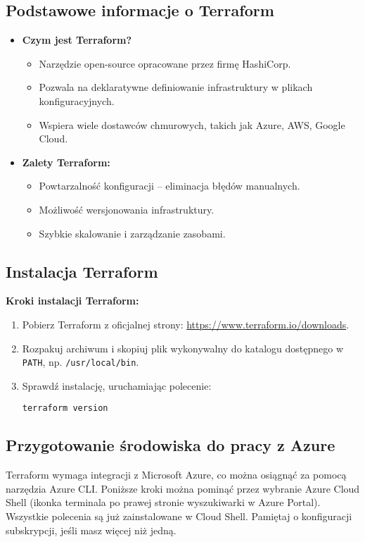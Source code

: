 \documentclass{article}
\begin{document}
\subsection{Podstawowe informacje o Terraform}
\begin{itemize}
    \item \textbf{Czym jest Terraform?}
    \begin{itemize}
        \item Narzędzie open-source opracowane przez firmę HashiCorp.
        \item Pozwala na deklaratywne definiowanie infrastruktury w plikach konfiguracyjnych.
        \item Wspiera wiele dostawców chmurowych, takich jak Azure, AWS, Google Cloud.
    \end{itemize}
    \item \textbf{Zalety Terraform:}
    \begin{itemize}
        \item Powtarzalność konfiguracji – eliminacja błędów manualnych.
        \item Możliwość wersjonowania infrastruktury.
        \item Szybkie skalowanie i zarządzanie zasobami.
    \end{itemize}
\end{itemize}

\subsection{Instalacja Terraform}
\textbf{Kroki instalacji Terraform:}
\begin{enumerate}
    \item Pobierz Terraform z oficjalnej strony: \url{https://www.terraform.io/downloads}.
    \item Rozpakuj archiwum i skopiuj plik wykonywalny do katalogu dostępnego w \texttt{PATH}, np. \texttt{/usr/local/bin}.
    \item Sprawdź instalację, uruchamiając polecenie:
    \begin{lstlisting}
terraform version
    \end{lstlisting}
\end{enumerate}

\subsection{Przygotowanie środowiska do pracy z Azure}
Terraform wymaga integracji z Microsoft Azure, co można osiągnąć za pomocą narzędzia Azure CLI. Poniższe kroki można pominąć przez wybranie Azure Cloud Shell (ikonka terminala po prawej stronie wyszukiwarki w Azure Portal). Wszystkie polecenia są już zainstalowane w Cloud Shell. Pamiętaj o konfiguracji subskrypcji, jeśli masz więcej niż jedną.
\end{document}
